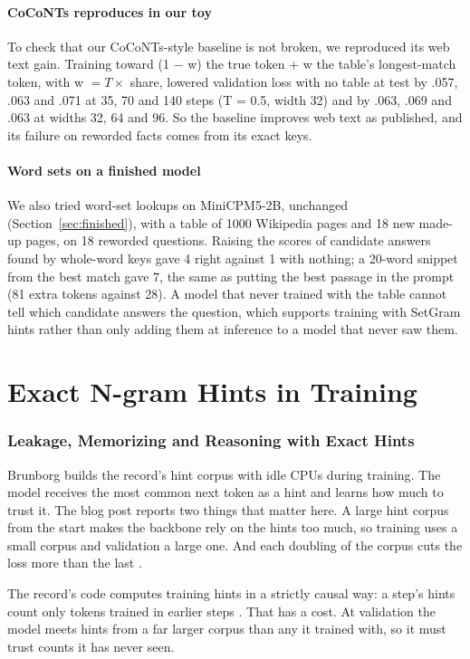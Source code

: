 \documentclass[11pt]{article}
\begin{document}
\subsection{CoCoNTs reproduces in our toy}
To check that our CoCoNTs-style baseline is not broken, we reproduced its web text gain. Training toward (1 $-$ w) the true token + w the table's longest-match token, with w $= T\times$ share, lowered validation loss with no table at test by .057, .063 and .071 at 35, 70 and 140 steps (T = 0.5, width 32) and by .063, .069 and .063 at widths 32, 64 and 96. So the baseline improves web text as published, and its failure on reworded facts comes from its exact keys.

\subsection{Word sets on a finished model}
We also tried word-set lookups on MiniCPM5-2B, unchanged (Section~\ref{sec:finished}), with a table of 1000 Wikipedia pages and 18 new made-up pages, on 18 reworded questions. Raising the scores of candidate answers found by whole-word keys gave 4 right against 1 with nothing; a 20-word snippet from the best match gave 7, the same as putting the best passage in the prompt (81 extra tokens against 28). A model that never trained with the table cannot tell which candidate answers the question, which supports training with SetGram hints rather than only adding them at inference to a model that never saw them.

\part{Exact N-gram Hints in Training}

\section{Leakage, Memorizing and Reasoning with Exact Hints}
Brunborg \cite{brunborg} builds the record's hint corpus with idle CPUs during training. The model receives the most common next token as a hint and learns how much to trust it. The blog post reports two things that matter here. A large hint corpus from the start makes the backbone rely on the hints too much, so training uses a small corpus and validation a large one. And each doubling of the corpus cuts the loss more than the last \cite{brunborg}.

The record's code computes training hints in a strictly causal way: a step's hints count only tokens trained in earlier steps \cite{repo}. That has a cost. At validation the model meets hints from a far larger corpus than any it trained with, so it must trust counts it has never seen.
\end{document}
